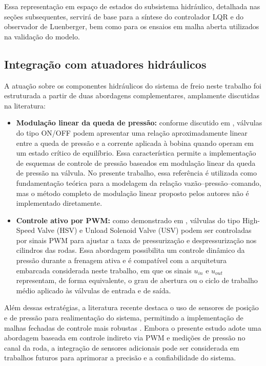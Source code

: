 Essa representação em espaço de estados do subsistema hidráulico, detalhada nas seções subsequentes, servirá de base para a síntese do controlador LQR e do observador de Luenberger, bem como para os ensaios em malha aberta utilizados na validação do modelo.

\subsection{Integração com atuadores hidráulicos}
\label{sec:controle-4-1-1}

A atuação sobre os componentes hidráulicos do sistema de freio neste trabalho foi estruturada a partir de duas abordagens complementares, amplamente discutidas na literatura:

\begin{itemize}
    \item \textbf{Modulação linear da queda de pressão:} conforme discutido em , válvulas do tipo ON/OFF podem apresentar uma relação aproximadamente linear entre a queda de pressão e a corrente aplicada à bobina quando operam em um estado crítico de equilíbrio. Essa característica permite a implementação de esquemas de controle de pressão baseados em modulação linear da queda de pressão na válvula. No presente trabalho, essa referência é utilizada como fundamentação teórica para a modelagem da relação vazão–pressão–comando, mas o método completo de modulação linear proposto pelos autores não é implementado diretamente.

    \item \textbf{Controle ativo por PWM:} como demonstrado em , válvulas do tipo High-Speed Valve (HSV) e Unload Solenoid Valve (USV) podem ser controladas por sinais PWM para ajustar a taxa de pressurização e despressurização nos cilindros das rodas. Essa abordagem possibilita um controle dinâmico da pressão durante a frenagem ativa e é compatível com a arquitetura embarcada considerada neste trabalho, em que os sinais $u_{in}$ e $u_{out}$ representam, de forma equivalente, o grau de abertura ou o ciclo de trabalho médio aplicado às válvulas de entrada e de saída.
\end{itemize}

Além dessas estratégias, a literatura recente destaca o uso de sensores de posição e de pressão para realimentação do sistema, permitindo a implementação de malhas fechadas de controle mais robustas \cite{HouhuaJingShihao2023}. Embora o presente estudo adote uma abordagem baseada em controle indireto via PWM e medições de pressão no canal da roda, a integração de sensores adicionais pode ser considerada em trabalhos futuros para aprimorar a precisão e a confiabilidade do sistema.

